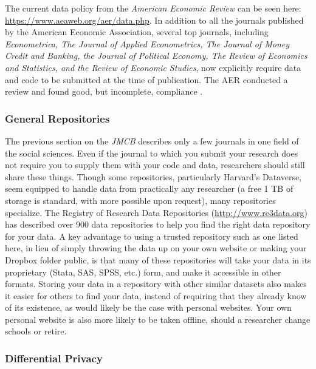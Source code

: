 \documentclass[12pt] {article}
\begin{document}
The current data policy from the \emph{American Economic Review} can be
seen here: \url{https://www.aeaweb.org/aer/data.php}. In addition to all
the journals published by the American Economic Association, several top
journals, including \emph{Econometrica, The Journal of Applied
Econometrics, The Journal of Money Credit and Banking, the Journal of
Political Economy, The Review of Economics and Statistics, and the
Review of Economic Studies}, now explicitly require data and code to be
submitted at the time of publication. The AER conducted a review and
found good, but incomplete, compliance \citep{glandon_report_2010}.



\subsubsection{General Repositories}\label{general-repositories}

The previous section on the \emph{JMCB} describes only a few journals in
one field of the social sciences. Even if the journal to which you
submit your research does not require you to supply them with your code
and data, researchers should still share these things. Though some
repositories, particularly Harvard's Dataverse, seem equipped to handle
data from practically any researcher (a free 1 TB of storage is
standard, with more possible upon request), many repositories specialize. The
Registry of Research Data Repositories (\url{http://www.re3data.org})
has described over 900 data repositories to help you find the right data
repository for your data. A key advantage to using a trusted repository
such as one listed here, in lieu of simply throwing the data up on your
own website or making your Dropbox folder public, is that many of these
repositories will take your data in its proprietary (Stata, SAS, SPSS,
etc.) form, and make it accessible in other formats. Storing your data in a repository with other similar datasets also makes it easier for others to find your data, instead of requiring that they already know of its existence, as would likely be the case with personal websites. Your own personal website is also more likely to be taken offline, should a researcher change schools or retire.

\subsubsection{Differential Privacy}\label{differential-privacy}
\end{document}
